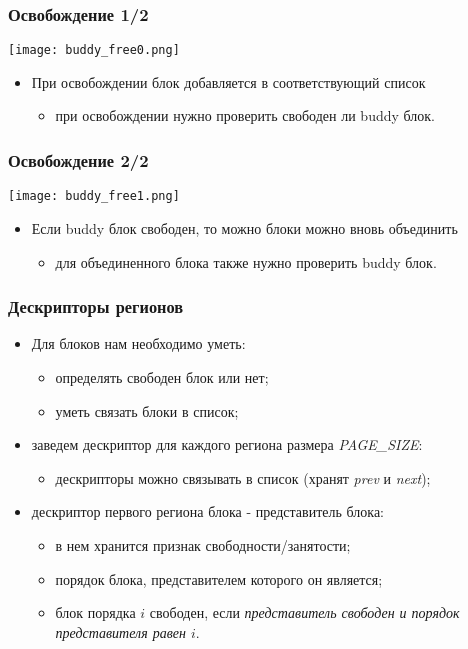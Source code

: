 \begin{frame}
\frametitle{Освобождение 1/2}
\begin{center}
  \texttt{[image: buddy\_free0.png]}
\end{center}
\begin{itemize}
  \item При освобождении блок добавляется в соответствующий список
  \begin{itemize}
    \item при освобождении нужно проверить свободен ли buddy блок.
  \end{itemize}
\end{itemize}
\end{frame}

\begin{frame}
\frametitle{Освобождение 2/2}
\begin{center}
  \texttt{[image: buddy\_free1.png]}
\end{center}
\begin{itemize}
  \item Если buddy блок свободен, то можно блоки можно вновь объединить
  \begin{itemize}
    \item для объединенного блока также нужно проверить buddy блок.
  \end{itemize}
\end{itemize}
\end{frame}

\begin{frame}
\frametitle{Дескрипторы регионов}
\begin{itemize}
  \item Для блоков нам необходимо уметь:
  \begin{itemize}
    \item определять свободен блок или нет;
    \item уметь связать блоки в список;
  \end{itemize}
  \item заведем дескриптор для каждого региона размера \emph{PAGE\_SIZE}:
  \begin{itemize}
    \item дескрипторы можно связывать в список (хранят \emph{prev} и
    \emph{next});
  \end{itemize}
  \item дескриптор первого региона блока - представитель блока:
  \begin{itemize}
    \item в нем хранится признак свободности/занятости;
    \item порядок блока, представителем которого он является;
    \item блок порядка $i$ свободен, если \emph{представитель свободен и
    порядок представителя равен $i$}.
  \end{itemize}
\end{itemize}
\end{frame}

